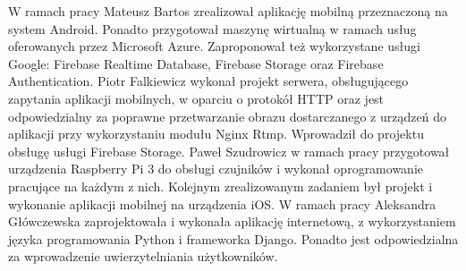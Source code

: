 W ramach pracy Mateusz Bartos zrealizował aplikację mobilną przeznaczoną na system Android. Ponadto przygotował maszynę wirtualną w ramach usług oferowanych przez Microsoft Azure. Zaproponował też wykorzystane usługi Google: Firebase Realtime Database, Firebase Storage oraz Firebase Authentication. Piotr Falkiewicz wykonał projekt serwera, obsługującego zapytania aplikacji mobilnych, w oparciu o protokół HTTP oraz jest odpowiedzialny za poprawne przetwarzanie obrazu dostarczanego z urządzeń do aplikacji przy wykorzystaniu modułu Nginx Rtmp. Wprowadził do projektu obsługę usługi Firebase Storage. Paweł Szudrowicz w ramach pracy przygotował urządzenia Raspberry Pi 3 do obsługi czujników i wykonał oprogramowanie pracujące na każdym z nich. Kolejnym zrealizowanym zadaniem był projekt i wykonanie aplikacji mobilnej na urządzenia iOS. W ramach pracy Aleksandra Główczewska zaprojektowała i wykonała aplikację internetową, z wykorzystaniem języka programowania Python i frameworka Django. Ponadto jest odpowiedzialna za wprowadzenie uwierzytelniania użytkowników.

